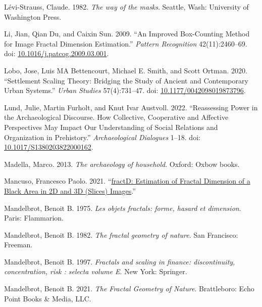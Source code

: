 \documentclass[
  12pt,
]{book}
\newlength{\cslhangindent}
\newlength{\cslentryspacingunit} %
\newenvironment{CSLReferences}[2] %
 {%
  \setlength{\parindent}{0pt}
  \ifodd #1
  \let\oldpar\par
  \def\par{\hangindent=\cslhangindent\oldpar}
  \fi
  \setlength{\parskip}{#2\cslentryspacingunit}
 }%
 {}
\begin{document}
\begin{CSLReferences}{1}{0}
\leavevmode{}%
Lévi-Strauss, Claude. 1982. \emph{The way of the masks}. Seattle, Wash: University of Washington Press.

\leavevmode{}%
Li, Jian, Qian Du, and Caixin Sun. 2009. {``An Improved Box-Counting Method for Image Fractal Dimension Estimation.''} \emph{Pattern Recognition} 42(11):2460--69. doi: \href{https://doi.org/10.1016/j.patcog.2009.03.001}{10.1016/j.patcog.2009.03.001}.

\leavevmode{}%
Lobo, Jose, Luis MA Bettencourt, Michael E. Smith, and Scott Ortman. 2020. {``Settlement Scaling Theory: Bridging the Study of Ancient and Contemporary Urban Systems.''} \emph{Urban Studies} 57(4):731--47. doi: \href{https://doi.org/10.1177/0042098019873796}{10.1177/0042098019873796}.

\leavevmode{}%
Lund, Julie, Martin Furholt, and Knut Ivar Austvoll. 2022. {``Reassessing Power in the Archaeological Discourse. How Collective, Cooperative and Affective Perspectives May Impact Our Understanding of Social Relations and Organization in Prehistory.''} \emph{Archaeological Dialogues} 1--18. doi: \href{https://doi.org/10.1017/S1380203822000162}{10.1017/S1380203822000162}.

\leavevmode{}%
Madella, Marco. 2013. \emph{The archaeology of household}. Oxford: Oxbow books.

\leavevmode{}%
Mancuso, Francesco Paolo. 2021. {``\href{https://CRAN.R-project.org/package=fractD}{fractD: Estimation of Fractal Dimension of a Black Area in 2D and 3D (Slices) Images}.''}

\leavevmode{}%
Mandelbrot, Benoit B. 1975. \emph{Les objets fractals: forme, hasard et dimension}. Paris: Flammarion.

\leavevmode{}%
Mandelbrot, Benoit B. 1982. \emph{The fractal geometry of nature}. San Francisco: Freeman.

\leavevmode{}%
Mandelbrot, Benoit B. 1997. \emph{Fractals and scaling in finance: discontinuity, concentration, risk : selecta volume E}. New York: Springer.

\leavevmode{}%
Mandelbrot, Benoit B. 2021. \emph{The Fractal Geometry of Nature}. Brattleboro: Echo Point Books \& Media, LLC.


\end{CSLReferences}
\end{document}
